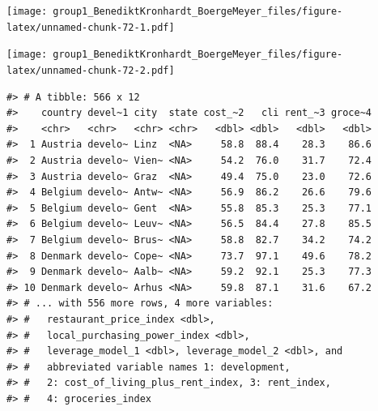 \documentclass[
  11pt,
  a4paper,
  twoside]{scrbook}
\newenvironment{Shaded}{\begin{snugshade}}{\end{snugshade}}
\newcommand{\AttributeTok}[1]{\textcolor[rgb]{0.77,0.63,0.00}{#1}}
\newcommand{\FloatTok}[1]{\textcolor[rgb]{0.00,0.00,0.81}{#1}}
\newcommand{\FunctionTok}[1]{\textcolor[rgb]{0.00,0.00,0.00}{#1}}
\newcommand{\NormalTok}[1]{#1}
\newcommand{\OtherTok}[1]{\textcolor[rgb]{0.56,0.35,0.01}{#1}}
\newcommand{\SpecialCharTok}[1]{\textcolor[rgb]{0.00,0.00,0.00}{#1}}
\newcommand{\StringTok}[1]{\textcolor[rgb]{0.31,0.60,0.02}{#1}}
\begin{document}
\linespread{1}\texttt{[image: group1\_BenediktKronhardt\_BoergeMeyer\_files/figure-latex/unnamed-chunk-72-1.pdf]} \linespread{1}

\begin{Shaded}
\end{Shaded}

\linespread{1}\texttt{[image: group1\_BenediktKronhardt\_BoergeMeyer\_files/figure-latex/unnamed-chunk-72-2.pdf]} \linespread{1}

\begin{Shaded}
\end{Shaded}

\linespread{1}

\begin{verbatim}
#> # A tibble: 566 x 12
#>    country devel~1 city  state cost_~2   cli rent_~3 groce~4
#>    <chr>   <chr>   <chr> <chr>   <dbl> <dbl>   <dbl>   <dbl>
#>  1 Austria develo~ Linz  <NA>     58.8  88.4    28.3    86.6
#>  2 Austria develo~ Vien~ <NA>     54.2  76.0    31.7    72.4
#>  3 Austria develo~ Graz  <NA>     49.4  75.0    23.0    72.6
#>  4 Belgium develo~ Antw~ <NA>     56.9  86.2    26.6    79.6
#>  5 Belgium develo~ Gent  <NA>     55.8  85.3    25.3    77.1
#>  6 Belgium develo~ Leuv~ <NA>     56.5  84.4    27.8    85.5
#>  7 Belgium develo~ Brus~ <NA>     58.8  82.7    34.2    74.2
#>  8 Denmark develo~ Cope~ <NA>     73.7  97.1    49.6    78.2
#>  9 Denmark develo~ Aalb~ <NA>     59.2  92.1    25.3    77.3
#> 10 Denmark develo~ Arhus <NA>     59.8  87.1    31.6    67.2
#> # ... with 556 more rows, 4 more variables:
#> #   restaurant_price_index <dbl>,
#> #   local_purchasing_power_index <dbl>,
#> #   leverage_model_1 <dbl>, leverage_model_2 <dbl>, and
#> #   abbreviated variable names 1: development,
#> #   2: cost_of_living_plus_rent_index, 3: rent_index,
#> #   4: groceries_index
\end{verbatim}
\end{document}
